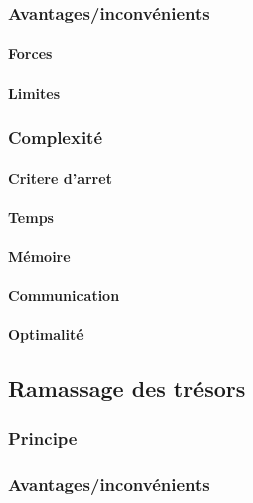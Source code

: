 \documentclass[a4paper, 10pt]{article}
\begin{document}
\subsubsection{Avantages/inconvénients}

\paragraph{Forces}

\paragraph{Limites}

\subsubsection{Complexité}

\paragraph{Critere d'arret}

\paragraph{Temps}

\paragraph{Mémoire}

\paragraph{Communication}

\paragraph{Optimalité}

\subsection{Ramassage des trésors}

\subsubsection{Principe}

\subsubsection{Avantages/inconvénients}
\end{document}
